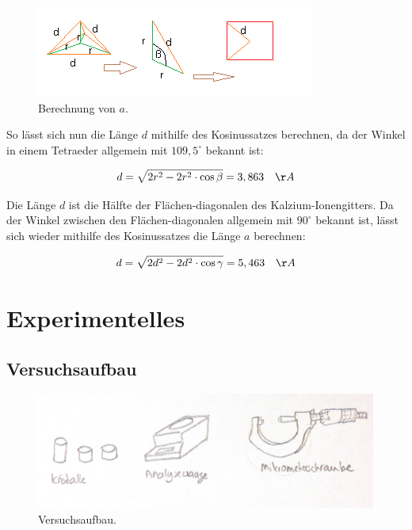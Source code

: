 \documentclass[12pt,a4paper,titlepage,headinclude,bibtotoc]{scrartcl}
\begin{document}
\begin{figure} [h]
\begin{center}
\includegraphics[scale=1]{a.png} \end{center}
\caption{Berechnung von $a$.}
\end{figure} 

\newpage

So lässt sich nun die Länge $d$ mithilfe des Kosinussatzes berechnen, da der Winkel in einem Tetraeder allgemein mit $109,5^\circ$ bekannt ist:

\begin{equation}
 d = \sqrt{2r^2-2r^2 \cdot \cos \beta } = 3, 863 \quad \AA
\end{equation}     

Die Länge $d$ ist die Hälfte der Flächen-diagonalen des Kalzium-Ionengitters. Da der Winkel zwischen den Flächen-diagonalen allgemein mit $ 90^\circ $ bekannt ist, lässt sich wieder mithilfe des Kosinussatzes die Länge $a$ berechnen:

\begin{equation}
 d = \sqrt{2d^2-2d^2 \cdot \cos \gamma } = 5,463 \quad \AA
\end{equation}   

\section{Experimentelles}


\subsection{Versuchsaufbau}
\begin{figure} [h]
\begin{center}
\includegraphics[scale=1]{Versuchsaufbau2.png} \end{center}
\caption{Versuchsaufbau.}
\end{figure} 
\end{document}

